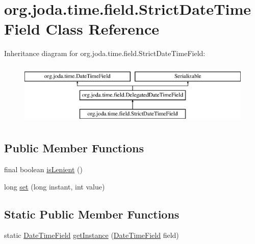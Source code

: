 \hypertarget{classorg_1_1joda_1_1time_1_1field_1_1_strict_date_time_field}{\section{org.\-joda.\-time.\-field.\-Strict\-Date\-Time\-Field Class Reference}
\label{classorg_1_1joda_1_1time_1_1field_1_1_strict_date_time_field}
}
Inheritance diagram for org.\-joda.\-time.\-field.\-Strict\-Date\-Time\-Field\-:\begin{figure}[H]
\begin{center}
\leavevmode
\includegraphics[height=3.000000cm]{classorg_1_1joda_1_1time_1_1field_1_1_strict_date_time_field}
\end{center}
\end{figure}
\subsection*{Public Member Functions}
\begin{DoxyCompactItemize}
\item 
final boolean \hyperlink{classorg_1_1joda_1_1time_1_1field_1_1_strict_date_time_field_abd59665ef667c1465152eaaa60ccd8d4}{is\-Lenient} ()
\item 
long \hyperlink{classorg_1_1joda_1_1time_1_1field_1_1_strict_date_time_field_aa3b06664937c7804feb504305b9ae0e9}{set} (long instant, int value)
\end{DoxyCompactItemize}
\subsection*{Static Public Member Functions}
\begin{DoxyCompactItemize}
\item 
static \hyperlink{classorg_1_1joda_1_1time_1_1_date_time_field}{Date\-Time\-Field} \hyperlink{classorg_1_1joda_1_1time_1_1field_1_1_strict_date_time_field_ad1ed62681c09ab01f59d4121f3d885bc}{get\-Instance} (\hyperlink{classorg_1_1joda_1_1time_1_1_date_time_field}{Date\-Time\-Field} field)
\end{DoxyCompactItemize}
